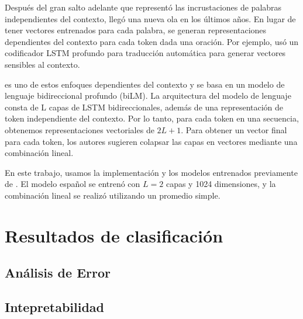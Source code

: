 Después del gran salto adelante que representó las incrustaciones de palabras independientes del contexto, llegó una nueva ola en los últimos años. En lugar de tener vectores entrenados para cada palabra, se generan representaciones dependientes del contexto para cada token dada una oración. Por ejemplo, \citet{mccann2017learned} usó un codificador LSTM profundo para traducción automática para generar vectores sensibles al contexto.

\elmo{} \cite{peters2018} es uno de estos enfoques dependientes del contexto y se basa en un modelo de lenguaje bidireccional profundo (biLM). La arquitectura del modelo de lenguaje consta de L capas de LSTM bidireccionales, además de una representación de token independiente del contexto. Por lo tanto, para cada token en una secuencia, obtenemos representaciones vectoriales de $ 2L + 1 $.
Para obtener un vector final para cada token, los autores sugieren colapsar las capas en vectores mediante una combinación lineal.

%

En este trabajo, usamos la implementación y los modelos entrenados previamente de \cite{che-EtAl:2018:K18-2}. El modelo español se entrenó con $L = 2 $ capas y 1024 dimensiones, y la combinación lineal se realizó utilizando un promedio simple.

\section{Resultados de clasificación}

\subsection{Análisis de Error}

\subsection{Intepretabilidad}


